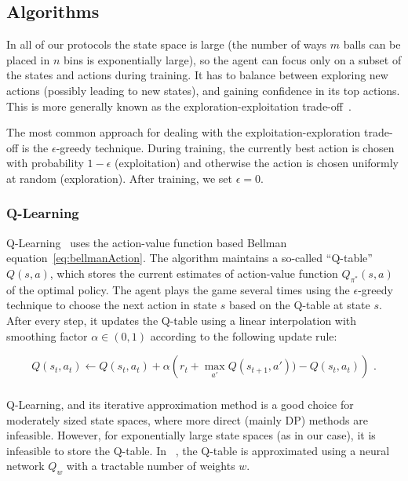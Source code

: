 \subsection{Algorithms}


In all of our protocols the state space is large (the number of ways $m$ balls can be placed in $n$ bins is exponentially large), so the agent can focus only on a subset of the states and actions during training. It has to balance between exploring new actions (possibly leading to new states), and gaining confidence in its top actions. This is more generally known as the exploration-exploitation trade-off~\cite{kaelbling1996explorationexploitation}.

The most common approach for dealing with the exploitation-exploration trade-off is the $\epsilon$-greedy technique. During training, the currently best action is chosen with probability $1-\epsilon$ (exploitation) and otherwise the action is chosen uniformly at random (exploration). After training, we set $\epsilon=0$.



\subsubsection*{Q-Learning}


Q-Learning~\cite{watkins1989qlearning} uses the action-value function based Bellman equation~\eqref{eq:bellmanAction}. The algorithm maintains a so-called ``Q-table'' $Q(s,a)$, which stores the current estimates of action-value function $Q_{\pi^*}(s,a)$ of the optimal policy. The agent plays the game several times using the $\epsilon$-greedy technique to choose the next action in state $s$ based on the Q-table at state $s$. After every step, it updates the Q-table using a linear interpolation with smoothing factor $\alpha \in (0,1)$ according to the following update rule:

\begin{equation} \label{eq:q-learningUpdate}
Q(s_t,a_t) \leftarrow Q(s_t,a_t) + \alpha\left( r_t + \max_{a'} Q(s_{t+1}, a')) - Q(s_t,a_t)\right) \text{ .}
\end{equation}


\subsubsection*{\DQL} \label{deepq-learning}


Q-Learning, and its iterative approximation method is a good choice for moderately sized state spaces, where more direct (mainly DP) methods are infeasible. However, for exponentially large state spaces (as in our case), it is infeasible to store the Q-table. In \DQL~\cite{mnih2013DQN}, the Q-table is approximated using a neural network $Q_w$ with a tractable number of weights $w$.

